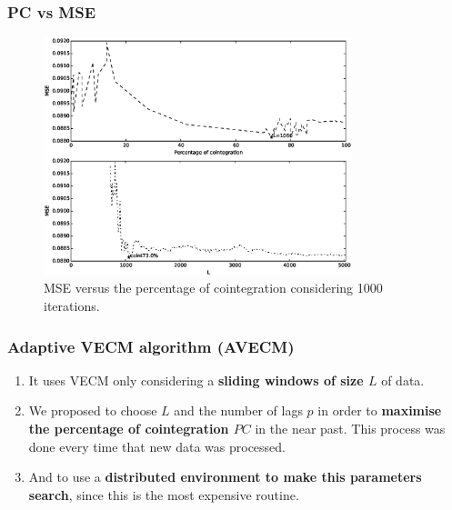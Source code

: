 \documentclass{beamer}
\begin{document}
\begin{frame}
\frametitle{PC vs MSE}
\begin{figure}[ht!]
  \centering
  \includegraphics[width=0.8\textwidth]{img/51_Fig2}
  \caption{MSE versus the percentage of cointegration considering 1000
  iterations. }
  \label{fig:cointvsmse}
\end{figure}
\end{frame}

\begin{frame}
\frametitle{Adaptive VECM algorithm (AVECM)}
\begin{enumerate}
\item It uses VECM only considering a {\bf sliding windows of size $L$} of data.
\item We proposed to choose $L$ and the number of lags $p$ in order to {\bf maximise the percentage of cointegration $PC$} in the near past. This process was done every time that new data was processed. 
\item And to use a {\bf distributed environment to make this parameters search}, since this is the most expensive routine.
\end{enumerate}
\end{frame}
\end{document}

